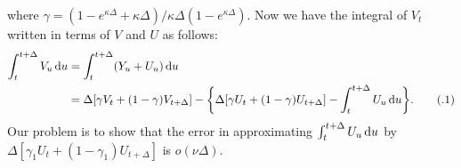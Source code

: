 \documentclass{ws-ijfe}
\newcommand\numberthis{\addtocounter{equation}{1}\tag{\theequation}}
\begin{document}
where $\gamma = (1-e^{\kappa\Delta}+\kappa\Delta)\big/\kappa\Delta(1-e^{\kappa\Delta})$.
Now we have the integral of $V_t$ written in terms of $V$ and $U$ as follows:
\begin{align*}
   \int_{t}^{t+\Delta}V_u\,\d u &= \int_{t}^{t+\Delta}(Y_u+U_u)\,\d u\\ 
   &=\Delta[\gamma  V_t+(1-\gamma ) V_{t+\Delta}]-\bigg\{\Delta[\gamma  U_t+(1-\gamma ) U_{t+\Delta}]-\int_{t}^{t+\Delta}U_u\,\d u\bigg\}.\numberthis\label{intV_U}
\end{align*}
Our problem is to show that the error in approximating $\int_{t}^{t+\Delta}U_u\,\mathrm{d} u$ by\\ $\Delta[\gamma_1 U_t+(1-\gamma_1) U_{t+\Delta}]$ is $o(\nu\Delta)$.
\end{document}

